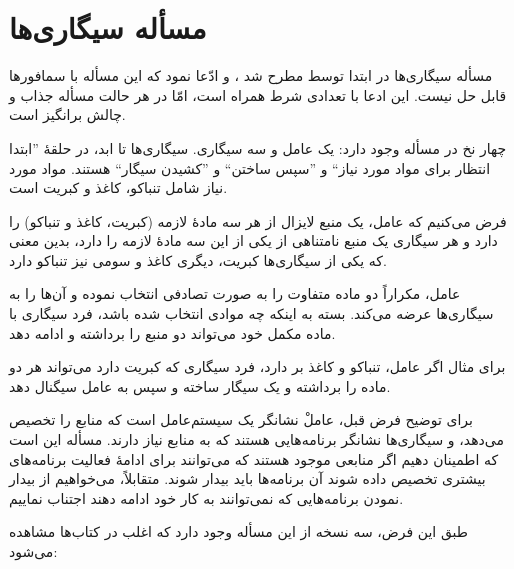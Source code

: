\documentclass{book}
\newcommand{\clearemptydoublepage}{\newpage\cleardoublepage}
\begin{document}
\clearemptydoublepage
\section {مسأله سیگاری‌ها}

    مسأله سیگاری‌ها در ابتدا توسط      مطرح شد \cite{patil}، و ادّعا نمود که  این مسأله با سمافورها قابل حل نیست. 
    این ادعا با تعدادی شرط همراه است، امّا در هر حالت مسأله جذاب و چالش برانگیز است. 

    چهار نخ در مسأله وجود دارد: یک عامل و سه سیگاری. 
    سیگاری‌ها تا ابد، در حلقهٔ ''ابتدا انتظار برای مواد مورد نیاز`` 
    و ''سپس ساختن`` و ''کشیدن سیگار`` هستند.
    مواد مورد نیاز شامل تنباکو، کاغذ و کبریت است. 

    فرض می‌کنیم که عامل، یک منبع لایزال از هر سه مادهٔ لازمه (کبریت، کاغذ و تنباکو) را  دارد 
    و هر سیگاری یک منبع نامتناهی از یکی از این سه مادهٔ لازمه را دارد، 
    بدین معنی که یکی از سیگاری‌ها کبریت، دیگری کاغذ و سومی نیز تنباکو دارد. 

    عامل، مکراراً دو ماده متفاوت را به صورت تصادفی انتخاب نموده و آن‌ها را به سیگاری‌ها عرضه می‌کند. 
    بسته به اینکه چه موادی انتخاب شده باشد، فرد سیگاری با ماده مکمل خود می‌تواند دو منبع را برداشته و ادامه دهد. 

    برای مثال اگر عامل، تنباکو و کاغذ بر دارد، فرد سیگاری که کبریت دارد می‌تواند هر دو ماده را برداشته 
    و یک سیگار ساخته و سپس به عامل سیگنال دهد. 

    برای توضیح فرض قبل،‌    
    عاملْ نشانگر یک سیستم‌عامل است که منابع را تخصیص می‌دهد، و سیگاری‌ها نشانگر برنامه‌هایی هستند که به منابع نیاز دارند. 
    مسأله این است که اطمینان دهیم اگر منابعی موجود هستند 
    که می‌توانند برای ادامهٔ فعالیت برنامه‌های بیشتری تخصیص داده شوند آن برنامه‌ها باید بیدار شوند. 
    متقابلاً، می‌خواهیم از بیدار نمودن برنامه‌هایی که نمی‌توانند به کار خود ادامه دهند اجتناب نماییم. 


    طبق این فرض، سه نسخه از این مسأله وجود دارد که اغلب در کتاب‌ها مشاهده می‌شود: 
\end{document}
